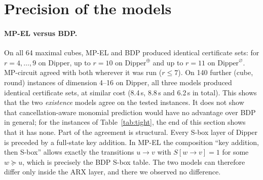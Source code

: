\documentclass[pdflatex,sn-mathphys-num]{sn-jnl}
\theoremstyle{thmstyleone}
\theoremstyle{thmstylethree}
\theoremstyle{thmstyletwo}
\newcommand{\MPEL}{\textsf{MP-EL}}
\newcommand{\MPC}{\textsf{MP-circuit}}
\newcommand{\BDP}{\textsf{BDP}}
\begin{document}
\section{Precision of the models}\label{sec:tightness}

\paragraph{\MPEL{} versus \BDP.} On all 64 maximal cubes, \MPEL{} and \BDP{} produced identical certificate sets: for $r=4,\dots,9$ on Dipper, up to $r=10$ on $\mathrm{Dipper}^{\oplus}$ and up to $r=11$ on $\mathrm{Dipper}^{\varnothing}$. \MPC{} agreed with both wherever it was run ($r\le7$). On 140 further (cube, round) instances of dimension 4--16 on Dipper, all three models produced identical certificate sets, at similar cost (8.4\,s, 8.8\,s and 6.2\,s in total). This shows that the two \emph{existence} models agree on the tested instances. It does not show that cancellation-aware monomial prediction would have no advantage over \BDP{} in general; for the instances of Table~\ref{tab:tight}, the end of this section shows that it has none. Part of the agreement is structural. Every S-box layer of Dipper is preceded by a full-state key addition. In \MPEL{} the composition ``key addition, then S-box'' allows exactly the transitions $u\to v$ with $S[w\to v]=1$ for some $w\succeq u$, which is precisely the BDP S-box table. The two models can therefore differ only inside the ARX layer, and there we observed no difference.
\end{document}
